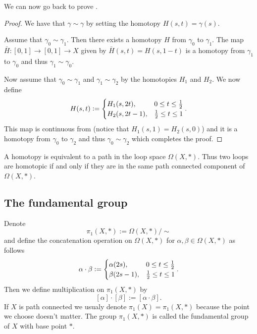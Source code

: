 \documentclass[11pt,a4paper]{article}
\begin{document}
We can now go back to prove .

\begin{proof}
  We have that $\gamma \sim \gamma$ by setting the homotopy
  $H(s,t) = \gamma(s)$.

  Assume that $\gamma_0 \sim \gamma_1$.
  Then there exists a homotopy $H$ from $\gamma_0$ to $\gamma_1$.
  The map $\bar H \colon [0,1] \to [0,1] \to X$ given by
  $\bar H(s,t) = H(s,1-t)$ is a homotopy from $\gamma_1$ to $\gamma_0$
  and thus $\gamma_1 \sim \gamma_0$.

  Now assume that $\gamma_0 \sim \gamma_1$ and $\gamma_1 \sim \gamma_2$
  by the homotopies $H_1$ and $H_2$.
  We now define
  \[
    H(s,t) :=
    \begin{cases}
      H_1(s,2t), &0 \le t \le \frac{1}{2} \\
      H_2(s,2t - 1), &\frac{1}{2} \le t \le 1
    \end{cases}.
  \]
  This map is continuous from  (notice that
  $H_1(s,1) = H_2(s,0)$) and it is a homotopy from $\gamma_0$ to $\gamma_2$
  and thus $\gamma_0 \sim \gamma_2$ which completes the proof.
\end{proof}

\begin{remark}
  A homotopy is equivalent to a path in the loop space $\Omega(X,*)$.
  Thus two loops are homotopic if and only if they are in the same
  path connected component of $\Omega(X,*)$.
\end{remark}

\subsection{The fundamental group}
\begin{definition}
  Denote
  \[
    \pi_1(X,*) := \Omega(X,*) / \sim
  \]
  and define the concatenation operation on $\Omega(X,*)$ for
  $\alpha, \beta \in \Omega(X,*)$ as follows
  \[
    \alpha \cdot \beta :=
    \begin{cases}
      \alpha(2s), & 0 \le t \le \frac{1}{2} \\
      \beta(2s - 1), & \frac{1}{2} \le t \le 1
    \end{cases}.
  \]
  Then we define multiplication on $\pi_1(X,*)$ by
  \[
    [\alpha] \cdot [\beta] := [\alpha \cdot \beta].
  \]
  If $X$ is path connected we usualy denote $\pi_1(X) = \pi_1(X,*)$
  because the point we choose doesn't matter.
  The group $\pi_1(X,*)$ is called the fundamental group of $X$ with base point
  $*$.
\end{definition}
\end{document}
